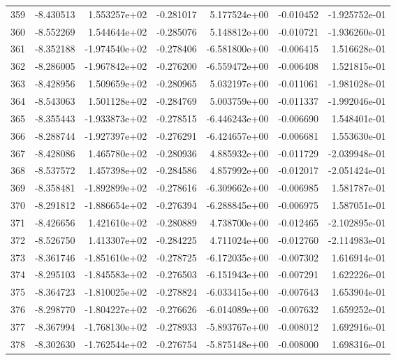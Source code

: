 \begin{tabular}{rrrrrrr}
 359 &  -8.430513 &  1.553257e+02 & -0.281017 &  5.177524e+00 &  -0.010452 & -1.925752e-01 \\
 360 &  -8.552269 &  1.544644e+02 & -0.285076 &  5.148812e+00 &  -0.010721 & -1.936260e-01 \\
 361 &  -8.352188 & -1.974540e+02 & -0.278406 & -6.581800e+00 &  -0.006415 &  1.516628e-01 \\
 362 &  -8.286005 & -1.967842e+02 & -0.276200 & -6.559472e+00 &  -0.006408 &  1.521815e-01 \\
 363 &  -8.428956 &  1.509659e+02 & -0.280965 &  5.032197e+00 &  -0.011061 & -1.981028e-01 \\
 364 &  -8.543063 &  1.501128e+02 & -0.284769 &  5.003759e+00 &  -0.011337 & -1.992046e-01 \\
 365 &  -8.355443 & -1.933873e+02 & -0.278515 & -6.446243e+00 &  -0.006690 &  1.548401e-01 \\
 366 &  -8.288744 & -1.927397e+02 & -0.276291 & -6.424657e+00 &  -0.006681 &  1.553630e-01 \\
 367 &  -8.428086 &  1.465780e+02 & -0.280936 &  4.885932e+00 &  -0.011729 & -2.039948e-01 \\
 368 &  -8.537572 &  1.457398e+02 & -0.284586 &  4.857992e+00 &  -0.012017 & -2.051424e-01 \\
 369 &  -8.358481 & -1.892899e+02 & -0.278616 & -6.309662e+00 &  -0.006985 &  1.581787e-01 \\
 370 &  -8.291812 & -1.886654e+02 & -0.276394 & -6.288845e+00 &  -0.006975 &  1.587051e-01 \\
 371 &  -8.426656 &  1.421610e+02 & -0.280889 &  4.738700e+00 &  -0.012465 & -2.102895e-01 \\
 372 &  -8.526750 &  1.413307e+02 & -0.284225 &  4.711024e+00 &  -0.012760 & -2.114983e-01 \\
 373 &  -8.361746 & -1.851610e+02 & -0.278725 & -6.172035e+00 &  -0.007302 &  1.616914e-01 \\
 374 &  -8.295103 & -1.845583e+02 & -0.276503 & -6.151943e+00 &  -0.007291 &  1.622226e-01 \\
 375 &  -8.364723 & -1.810025e+02 & -0.278824 & -6.033415e+00 &  -0.007643 &  1.653904e-01 \\
 376 &  -8.298770 & -1.804227e+02 & -0.276626 & -6.014089e+00 &  -0.007632 &  1.659252e-01 \\
 377 &  -8.367994 & -1.768130e+02 & -0.278933 & -5.893767e+00 &  -0.008012 &  1.692916e-01 \\
 378 &  -8.302630 & -1.762544e+02 & -0.276754 & -5.875148e+00 &  -0.008000 &  1.698316e-01 \\

\end{tabular}
